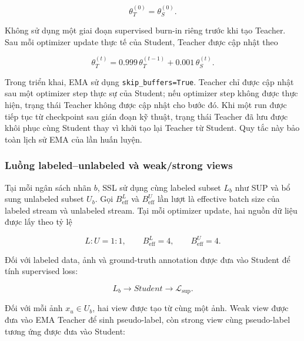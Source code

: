 \documentclass[pdflatex,sn-mathphys-num]{sn-jnl}%
\theoremstyle{thmstyleone}%
\theoremstyle{thmstyletwo}%
\theoremstyle{thmstylethree}%
\begin{document}
\begin{equation}
\theta_T^{(0)}
=
\theta_S^{(0)}.
\label{eq:teacher_student_initialization}
\end{equation}

Không sử dụng một giai đoạn supervised burn-in riêng trước khi tạo Teacher.
Sau mỗi optimizer update thực tế của Student, Teacher được cập nhật theo

\begin{equation}
\theta_T^{(t)}
=
0.999\,\theta_T^{(t-1)}
+
0.001\,\theta_S^{(t)}.
\label{eq:teacher_ema_update}
\end{equation}

Trong triển khai, EMA sử dụng
\texttt{skip\_buffers=True}. Teacher chỉ được cập nhật sau một optimizer
step thực sự của Student; nếu optimizer step không được thực hiện, trạng thái
Teacher không được cập nhật cho bước đó. Khi một run được tiếp tục từ
checkpoint sau gián đoạn kỹ thuật, trạng thái Teacher đã lưu được khôi phục
cùng Student thay vì khởi tạo lại Teacher từ Student. Quy tắc này bảo toàn
lịch sử EMA của lần huấn luyện.

\subsubsection{Luồng labeled--unlabeled và weak/strong views}
\label{subsubsec:ssl_labeled_unlabeled_streams}
\label{subsubsec:ssl_weak_strong_augmentation}

Tại mỗi ngân sách nhãn \(b\), SSL sử dụng cùng labeled subset \(L_b\) như
SUP và bổ sung unlabeled subset \(U_b\). Gọi \(B^{L}_{\mathrm{eff}}\) và
\(B^{U}_{\mathrm{eff}}\) lần lượt là effective batch size của labeled stream
và unlabeled stream. Tại mỗi optimizer update, hai nguồn dữ liệu được lấy theo
tỷ lệ

\begin{equation}
L:U=1:1,
\qquad
B^{L}_{\mathrm{eff}}=4,
\qquad
B^{U}_{\mathrm{eff}}=4.
\label{eq:ssl_effective_batches}
\end{equation}

Đối với labeled data, ảnh và ground-truth annotation được đưa vào Student
để tính supervised loss:

\begin{equation}
L_b
\longrightarrow
Student
\longrightarrow
\mathcal{L}_{\mathrm{sup}}.
\label{eq:labeled_stream_student}
\end{equation}

Đối với mỗi ảnh \(x_u\in U_b\), hai view được tạo từ cùng một ảnh. Weak view
được đưa vào EMA Teacher để sinh pseudo-label, còn strong view cùng
pseudo-label tương ứng được đưa vào Student:
\end{document}
